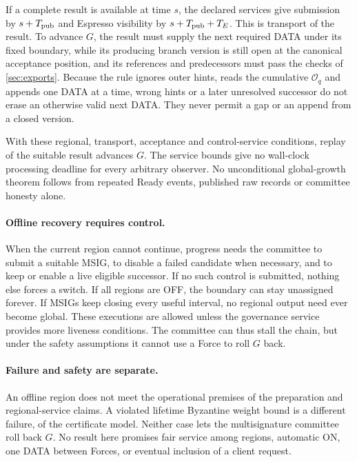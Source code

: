 \documentclass[11pt,a4paper]{article}
\begin{document}
If a complete result is available at time $s$, the declared services give
submission by $s+T_{\rm pub}$ and Espresso visibility by
$s+T_{\rm pub}+T_E$. This is transport of the result. To advance $G$, the
result must supply the next required DATA under its fixed boundary, while
its producing branch version is still open at the canonical acceptance
position, and its references and predecessors must pass the checks of
\cref{sec:exports}. Because the rule ignores outer hints, reads the
cumulative $\mathcal O_q$ and appends one DATA at a time, wrong hints or
a later unresolved successor do not erase an otherwise valid next DATA. They never permit a gap or an append from a
closed version.

With these regional, transport, acceptance and control-service
conditions, replay of the suitable result advances $G$. The service
bounds give no wall-clock processing deadline for every arbitrary
observer. No unconditional global-growth theorem follows from repeated
Ready events, published raw records or committee honesty alone.

\paragraph{Offline recovery requires control.}
When the current region cannot continue, progress needs the committee to
submit a suitable MSIG, to disable a failed candidate when necessary, and
to keep or enable a live eligible successor. If no such control is
submitted, nothing else forces a switch. If all regions are OFF, the
boundary can stay unassigned forever. If MSIGs keep closing every useful
interval, no regional output need ever become global. These executions
are allowed unless the governance service provides more liveness
conditions. The committee can thus stall the chain, but under the
safety assumptions it cannot use a Force to roll $G$ back.

\paragraph{Failure and safety are separate.}
An offline region does not meet the operational premises of the
preparation and regional-service claims. A violated lifetime Byzantine
weight bound is a different failure, of the certificate model. Neither
case lets the multisignature committee roll back $G$. No result here
promises fair service among regions, automatic ON, one DATA between
Forces, or eventual inclusion of a client request.
\end{document}
